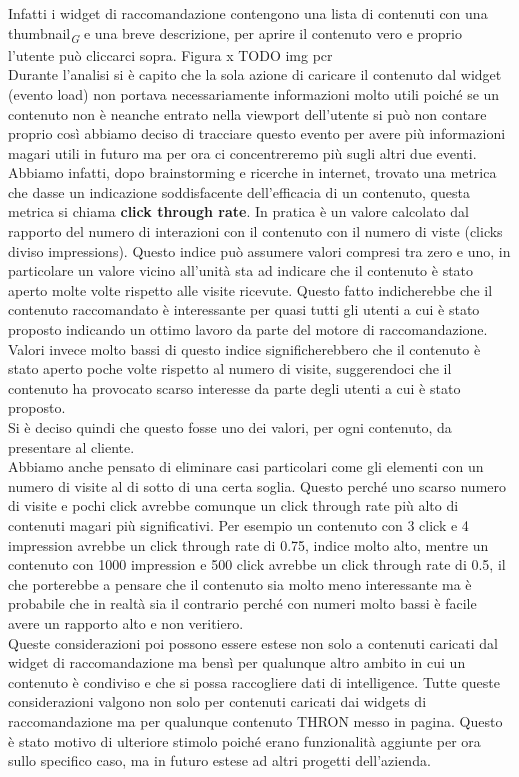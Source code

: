 \documentclass[a4paper, 12pt, twoside, openright]{book}
\newcommand{\gloss}[1]{#1\textsubscript{\textit{\tiny{G}}}}
\begin{document}
Infatti i widget di raccomandazione contengono una lista di contenuti con una \gloss{thumbnail} e una breve descrizione, per aprire il contenuto vero e proprio l'utente può cliccarci sopra. Figura x TODO img pcr\\
Durante l'analisi si è capito che la sola azione di caricare il contenuto dal widget (evento load) non portava necessariamente informazioni molto utili poiché se un contenuto non è neanche entrato nella viewport dell'utente si può non contare proprio così abbiamo deciso di tracciare questo evento per avere più informazioni magari utili in futuro ma per ora ci concentreremo più sugli altri due eventi.\\
Abbiamo infatti, dopo brainstorming e ricerche in internet, trovato una metrica che dasse un indicazione soddisfacente dell'efficacia di un contenuto, questa metrica si chiama \textbf{click through rate}. In pratica è un valore calcolato dal rapporto del numero di interazioni con il contenuto con il numero di viste (clicks diviso impressions). Questo indice può assumere valori compresi tra zero e uno, in particolare un valore vicino all'unità sta ad indicare che il contenuto è stato aperto molte volte rispetto alle visite ricevute. Questo fatto indicherebbe che il contenuto raccomandato è interessante per quasi tutti gli utenti a cui è stato proposto indicando un ottimo lavoro da parte del motore di raccomandazione. Valori invece molto bassi di questo indice significherebbero che il contenuto è stato aperto poche volte rispetto al numero di visite, suggerendoci che il contenuto ha provocato scarso interesse da parte degli utenti a cui è stato proposto.\\
Si è deciso quindi che questo fosse uno dei valori, per ogni contenuto, da presentare al cliente.\\Abbiamo anche pensato di eliminare casi particolari come gli elementi con un numero di visite al di sotto di una certa soglia. Questo perché uno scarso numero di visite e pochi click avrebbe comunque un click through rate più alto di contenuti magari più significativi. Per esempio un contenuto con 3 click e 4 impression avrebbe un click through rate di 0.75, indice molto alto, mentre un contenuto con 1000 impression e 500 click avrebbe un click through rate di 0.5, il che porterebbe a pensare che il contenuto sia molto meno interessante ma è probabile che in realtà sia il contrario perché con numeri molto bassi è facile avere un rapporto alto e non veritiero.\\
Queste considerazioni poi possono essere estese non solo a contenuti caricati dal widget di raccomandazione ma bensì per qualunque altro ambito in cui un contenuto è condiviso e che si possa raccogliere dati di intelligence.
Tutte queste considerazioni valgono non solo per contenuti caricati dai widgets di raccomandazione ma per qualunque contenuto THRON messo in pagina. Questo è stato motivo di ulteriore stimolo poiché erano funzionalità aggiunte per ora sullo specifico caso, ma in futuro estese ad altri progetti dell'azienda.
\end{document}
